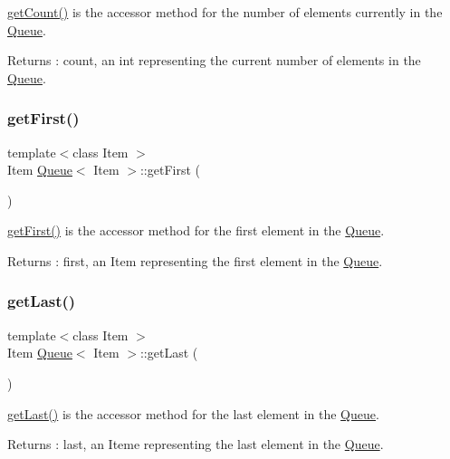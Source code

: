 \hyperlink{class_queue_af7cc83c36b93e41575dbe938d4ef3f2b}{get\+Count()} is the accessor method for the number of elements currently in the \hyperlink{class_queue}{Queue}. \begin{DoxyReturn}{Returns}
\+: count, an int representing the current number of elements in the \hyperlink{class_queue}{Queue}. 
\end{DoxyReturn}
\mbox{\label{class_queue_a15c3329a7420cae121756c940cee2dbd}} 
\subsubsection{\texorpdfstring{get\+First()}{getFirst()}}
{\footnotesize\ttfamily template$<$class Item $>$ \\
Item \hyperlink{class_queue}{Queue}$<$ Item $>$\+::get\+First (\begin{DoxyParamCaption}{ }\end{DoxyParamCaption})}

\hyperlink{class_queue_a15c3329a7420cae121756c940cee2dbd}{get\+First()} is the accessor method for the first element in the \hyperlink{class_queue}{Queue}. \begin{DoxyReturn}{Returns}
\+: first, an Item representing the first element in the \hyperlink{class_queue}{Queue}. 
\end{DoxyReturn}
\mbox{\label{class_queue_ae4235161a26b4452f7c56fcfff3866d2}} 
\subsubsection{\texorpdfstring{get\+Last()}{getLast()}}
{\footnotesize\ttfamily template$<$class Item $>$ \\
Item \hyperlink{class_queue}{Queue}$<$ Item $>$\+::get\+Last (\begin{DoxyParamCaption}{ }\end{DoxyParamCaption})}

\hyperlink{class_queue_ae4235161a26b4452f7c56fcfff3866d2}{get\+Last()} is the accessor method for the last element in the \hyperlink{class_queue}{Queue}. \begin{DoxyReturn}{Returns}
\+: last, an Iteme representing the last element in the \hyperlink{class_queue}{Queue}. 
\end{DoxyReturn}
\mbox{\label{class_queue_a3b4fdca4e9907c895f77557a9c928524}} 
